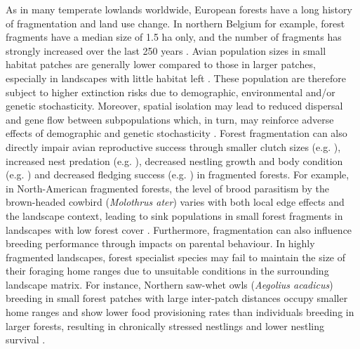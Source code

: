 \documentclass[10pt, twoside]{book} %
\begin{document}
As in many temperate lowlands worldwide, European forests have a long history of fragmentation and land use change. In northern Belgium for example, forest fragments have a median size of 1.5 ha only, and the number of fragments has strongly increased over the last 250 years \citep{DeKeersmaeker2014}. Avian population sizes in small habitat patches are generally lower compared to those in larger patches, especially in landscapes with little habitat left \citep{Andren1994}. These population are therefore subject to higher extinction risks due to demographic, environmental and/or genetic stochasticity. Moreover, spatial isolation may lead to reduced dispersal and gene flow between subpopulations which, in turn, may reinforce adverse effects of demographic and genetic stochasticity \citep{Cooper2002}. Forest fragmentation can also directly impair avian reproductive success through smaller clutch sizes (e.g. \citealt{Wilkin2007a}), increased nest predation (e.g. \citealt{Deng2005, Huhta2004}), decreased nestling growth and body condition (e.g. \citealt{Bueno-Enciso2016}) and decreased fledging success (e.g. \citealt{Hinsley2009}) in fragmented forests. For example, in North-American fragmented forests, the level of brood parasitism by the brown-headed cowbird (\textit{Molothrus ater}) varies with both local edge effects and the landscape context, leading to sink populations in small forest fragments in landscapes with low forest cover \citep{Lloyd2005}. Furthermore, fragmentation can also influence breeding performance through impacts on parental behaviour. In highly fragmented landscapes, forest specialist species may fail to maintain the size of their foraging home ranges due to unsuitable conditions in the surrounding landscape matrix. For instance, Northern saw-whet owls (\textit{Aegolius acadicus}) breeding in small forest patches with large inter-patch distances occupy smaller home ranges and show lower food provisioning rates than individuals breeding in larger forests, resulting in chronically stressed nestlings and lower nestling survival \citep{Hinam2008}.\\
\end{document}
